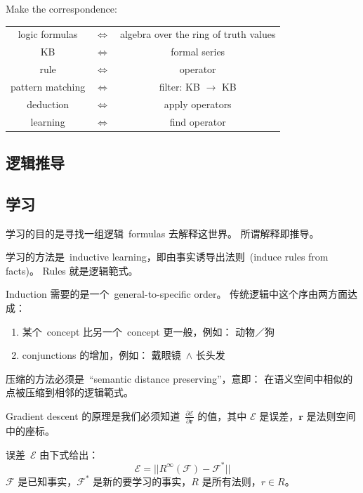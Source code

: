 Make the correspondence:
\begin{center}
\begin{tabular}{ccc}
logic formulas & $\Leftrightarrow$ & algebra over the ring of truth values \\
KB & $\Leftrightarrow$ & formal series \\
rule & $\Leftrightarrow$ & operator \\
pattern matching & $\Leftrightarrow$ & filter: KB $\rightarrow$ KB \\ 
deduction & $\Leftrightarrow$ & apply operators \\
learning & $\Leftrightarrow$ & find operator \\ 
\end{tabular}
\end{center}

\subsection{逻辑推导}

\subsection{学习}


学习的目的是寻找一组逻辑\  formulas 去解释这世界。  所谓解释即推导。

学习的方法是\  inductive learning，即由事实诱导出法则\  (induce rules from facts)。 Rules 就是逻辑範式。

Induction 需要的是一个\  general-to-specific order。  传统逻辑中这个序由两方面达成：
\begin{enumerate}
\item 某个\  concept 比另一个\  concept 更一般，例如： 动物／狗
\item conjunctions 的增加，例如： 戴眼镜\  $\wedge$ 长头发
\end{enumerate}

压缩的方法必须是\  ``semantic distance preserving''，意即： 在语义空间中相似的点被压缩到相邻的逻辑範式。

Gradient descent 的原理是我们必须知道\  $\frac{\partial\mathcal{E}}{\partial\mathbf{r}}$ 的值，其中 $\mathcal{E}$ 是误差，$\mathbf{r}$ 是法则空间中的座标。

误差\  $\mathcal{E}$ 由下式给出：
$$ \mathcal{E} = || R^\infty(\mathcal{F}) - \mathcal{F}^* || $$ 
$\mathcal{F}$ 是已知事实，$\mathcal{F}^*$ 是新的要学习的事实，$R$ 是所有法则，$r \in R$。

